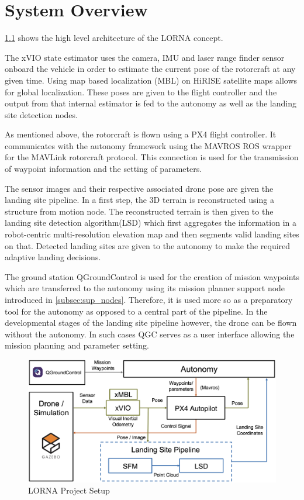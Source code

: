\chapter{System Overview}

\cref{fig:lorna_setup} shows the high level architecture of the LORNA concept. 

The xVIO state estimator uses the camera, IMU and laser range finder sensor onboard the vehicle in order to estimate the current pose of the rotorcraft at any given time. Using map based localization (MBL) on HiRISE satellite maps allows for global localization. These poses are given to the flight controller and the output from that internal estimator is fed to the autonomy as well as the landing site detection nodes.

As mentioned above, the rotorcraft is flown using a PX4 flight controller. It communicates with the autonomy framework using the MAVROS ROS wrapper for the MAVLink rotorcraft protocol. This connection is used for the transmission of waypoint information and the setting of parameters.

The sensor images and their respective associated drone pose are given the landing site pipeline. In a first step, the 3D terrain is reconstructed using a structure from motion node. The reconstructed terrain is then given to the landing site detection algorithm(LSD) which first aggregates the information in a robot-centric multi-resolution elevation map and then segments valid landing sites on that. Detected landing sites are given to the autonomy to make the required adaptive landing decisions.

The ground station QGroundControl is used for the creation of mission waypoints which are transferred to the autonomy using its mission planner support node introduced in \cref{subsec:sup_nodes}. Therefore, it is used more so as a preparatory tool for the autonomy as opposed to a central part of the pipeline. In the developmental stages of the landing site pipeline however, the drone can be flown without the autonomy. In such cases QGC serves as a user interface allowing the mission planning and parameter setting. 


\clearpage %

\begin{figure}[ht]
    \centering
    \includegraphics[scale=0.18]{images/system_overview/setup_flowchart_with_vio.png}
    \caption{LORNA Project Setup}
    \label{fig:lorna_setup}
\end{figure}

